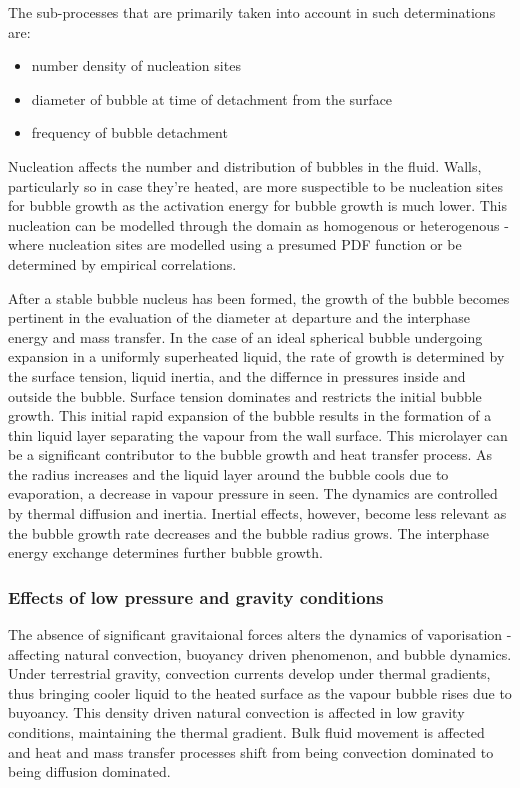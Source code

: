 The sub-processes that are primarily taken into account in such determinations are:
\begin{itemize}
    \item number density of nucleation sites
    \item diameter of bubble at time of detachment from the surface
    \item frequency of bubble detachment
\end{itemize}
Nucleation affects the number and distribution of bubbles in the fluid. Walls, particularly so in case they're heated, are more suspectible to be nucleation sites for bubble growth
 as the activation energy for bubble growth is much lower. This nucleation can be modelled through the domain as homogenous or heterogenous - where nucleation sites are modelled using a 
 presumed PDF function or be determined by empirical correlations.~\cite{liaoComputationalModellingFlash2017}

After a stable bubble nucleus has been formed, the growth of the bubble becomes pertinent in the evaluation
 of the diameter at departure and the interphase energy and mass transfer. In the case of an ideal
 spherical bubble undergoing expansion in a uniformly superheated liquid, the rate of growth
 is determined by the surface tension, liquid inertia, and the differnce in pressures inside
 and outside the bubble. Surface tension dominates and restricts the initial bubble growth.
 This initial rapid expansion of the bubble results in the formation of a thin liquid layer separating
 the vapour from the wall surface. This microlayer can be a significant contributor to the 
 bubble growth and heat transfer process.
 As the radius increases and the liquid layer around the bubble cools due to evaporation,
 a decrease in vapour pressure in seen. The dynamics are controlled by thermal diffusion
 and inertia. Inertial effects, however, become less relevant as the bubble growth rate decreases
 and the bubble radius grows. The interphase energy exchange determines further bubble growth.~\cite{sherFlashboilingAtomization2008}

\subsubsection{Effects of low pressure and gravity conditions}
The absence of significant gravitaional forces alters the dynamics of vaporisation - affecting natural convection, buoyancy
 driven phenomenon, and bubble dynamics. Under terrestrial gravity, convection currents develop under thermal
 gradients, thus bringing cooler liquid to the heated surface as the vapour bubble rises due
 to buyoancy. This density driven natural convection is affected in low gravity conditions, maintaining
 the thermal gradient. Bulk fluid movement is affected and heat and mass transfer processes shift
 from being convection dominated to being diffusion dominated.~\cite{cochranEffectsFluidProperties, leeExperimentalComputationalInvestigation2022}

